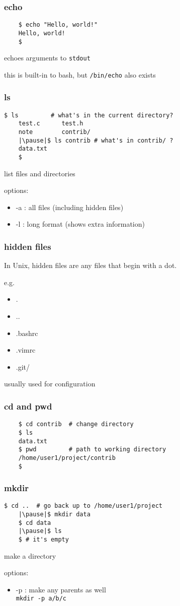 \documentclass[%
        hyperref={%
                pdfauthor={Zakariyya Mughal},%
                pdfpagemode={None},pdfpagelayout={SinglePage}}%
        xcolor={x11names},%
]{beamer}
\begin{document}
\begin{frame}[fragile]
	\frametitle{echo}
	\begin{lstlisting}
	$ echo "Hello, world!"
	Hello, world!
	$
	\end{lstlisting}
	
	echoes arguments to \texttt{stdout}

	this is built-in to bash, but \texttt{/bin/echo} also exists
\end{frame}

\begin{frame}[fragile]
	\frametitle{ls}
	\begin{lstlisting}[escapeinside=||]
	$ ls         # what's in the current directory?
	test.c      test.h
	note        contrib/
	|\pause|$ ls contrib # what's in contrib/ ?
	data.txt
	$
	\end{lstlisting}
	\pause
	list files and directories

	options:
	\begin{itemize}
		\item -a : all files (including hidden files)
		\item -l : long format (shows extra information)
	\end{itemize}
\end{frame}

\begin{frame}
	\frametitle{hidden files}
	In Unix, hidden files are any files that begin with a dot.

	e.g.
	\begin{itemize}
		\item .
		\item ..
		\item .bashrc
		\item .vimrc
		\item .git/
	\end{itemize}

	usually used for configuration
\end{frame}

\begin{frame}[fragile]
	\frametitle{cd and pwd}
	\begin{lstlisting}
	$ cd contrib  # change directory
	$ ls
	data.txt
	$ pwd         # path to working directory
	/home/user1/project/contrib
	$
	\end{lstlisting}
\end{frame}

\begin{frame}[fragile]
	\frametitle{mkdir}
	\begin{lstlisting}[escapeinside=||]
	$ cd ..  # go back up to /home/user1/project
	|\pause|$ mkdir data
	$ cd data
	|\pause|$ ls
	$ # it's empty
	\end{lstlisting}

	make a directory

	\pause
	options:
	\begin{itemize}
		\item -p : make any parents as well\\
			\qquad\texttt{mkdir -p a/b/c}
	\end{itemize}
\end{frame}
\end{document}
